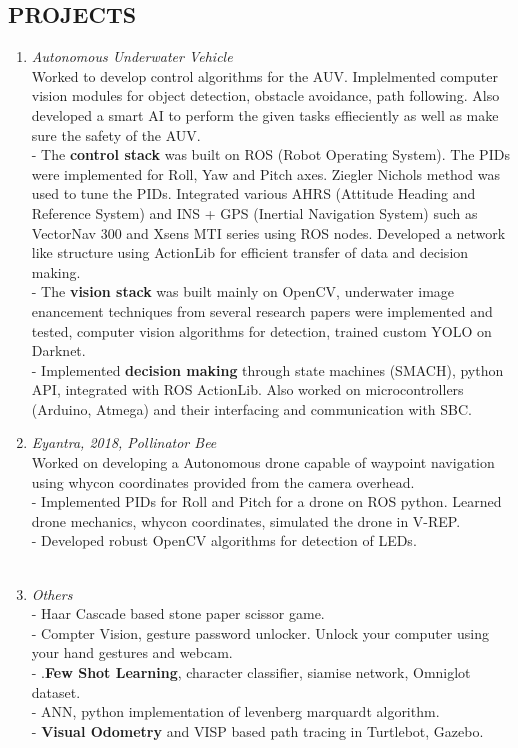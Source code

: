 \documentclass[margin]{res}
\begin{document}
\begin{resume}
\section{PROJECTS } \begin{enumerate}
  \item  {\large{\sl Autonomous Underwater Vehicle}}\\
 Worked to develop control algorithms for the AUV. Implelmented computer vision modules for object detection, obstacle avoidance, path following. Also developed a smart AI to perform the given tasks effieciently as well as make sure the safety of the AUV.\\
        - The   \textbf{control stack} was built on ROS (Robot Operating System). The PIDs were implemented for Roll, Yaw and Pitch axes. Ziegler Nichols method was used to tune the PIDs. Integrated various AHRS (Attitude Heading and Reference System) and INS + GPS (Inertial Navigation System) such as VectorNav 300 and Xsens MTI series using ROS nodes. Developed a network like structure using ActionLib for efficient transfer of data and decision making.\\
        - The   \textbf{vision stack} was built mainly on OpenCV, underwater image enancement techniques from several research papers were implemented and tested, computer vision algorithms for detection, trained custom YOLO on Darknet.\\
	- Implemented   \textbf{decision making} through state machines (SMACH), python API, integrated with ROS ActionLib. Also worked on microcontrollers (Arduino, Atmega) and their interfacing and communication with SBC.
 \item {\large{\sl Eyantra, 2018, Pollinator Bee}}\\
 Worked on developing a Autonomous drone capable of waypoint navigation using whycon coordinates provided from the camera overhead.\\
  	- Implemented PIDs for Roll and Pitch for a drone on ROS python. Learned drone mechanics, whycon coordinates, simulated the drone in V-REP. \\
	- Developed robust OpenCV algorithms for detection of LEDs. \\
\\
 \item {\large{\sl Others}}\\

  	- Haar Cascade based stone paper scissor game. \\
	- Compter Vision, gesture password unlocker. Unlock your computer using your hand gestures and webcam.\\
	- .\textbf{Few Shot Learning}, character  classifier, siamise network,  Omniglot dataset. \\
	- ANN, python implementation of levenberg marquardt algorithm.\\
	- \textbf{Visual Odometry} and VISP based path tracing in Turtlebot, Gazebo.\\
	\end{enumerate}


\end{resume}
\end{document}
